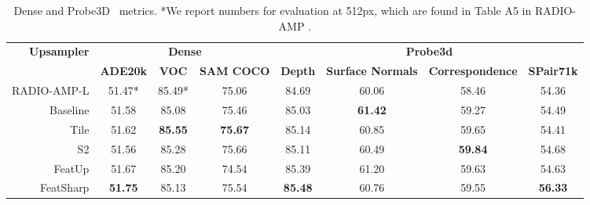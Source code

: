 \begin{table}[h]
    \centering
    \begin{tabular}{r|ccc|cccc}
        \multirow{2}{*}{\bf{Upsampler}} & \multicolumn{3}{c|}{\bf{Dense}} & \multicolumn{4}{c}{\bf{Probe3d}} \\
            & \bf{ADE20k} & \bf{VOC} & \bf{SAM COCO} & \bf{Depth} & \bf{Surface Normals} & \bf{Correspondence} & \bf{SPair71k} \\
        \hline
        RADIO-AMP-L & 51.47*     & 85.49*     & 75.06      & 84.69      & 60.06      & 58.46      & 54.36      \\
        \hline
        Baseline    & 51.58      & 85.08      & 75.46      & 85.03      & \bf{61.42} & 59.27      & 54.49      \\
        Tile        & 51.62      & \bf{85.55} & \bf{75.67} & 85.14      & 60.85      & 59.65      & 54.41      \\
        S2          & 51.56      & 85.28      & 75.66      & 85.11      & 60.49      & \bf{59.84} & 54.68      \\
        FeatUp      & 51.67      & 85.20      & 74.54      & 85.39      & 61.20      & 59.63      & 54.63      \\
        FeatSharp   & \bf{51.75} & 85.13      & 75.54      & \bf{85.48} & 60.76      & 59.55      & \bf{56.33} \\
    \end{tabular}
    \caption{Dense and Probe3D~\citep{elbanani2024probing} metrics. *We report numbers for evaluation at 512px, which are found in Table A5 in RADIO-AMP \cite{heinrich2024radioamplifiedimprovedbaselines}.}
    \label{tab:apdx:radio_dense_probe3d_metrics}
\end{table}

